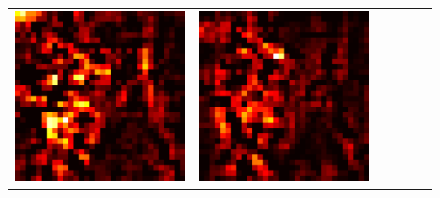 \documentclass[preprint,12pt]{elsarticle}
\begin{document}
\begin{figure}[ht]
\begin{tabular}{cccccc}
  \includegraphics[scale=\scale]{../visualizations/examples/cifar10/cnn/positive_saliency_map/2.png} & 
  \includegraphics[scale=\scale]{../visualizations/examples/cifar10/cnn/negative_saliency_map/2.png} & 

\end{tabular}
\end{figure}
\end{document}
